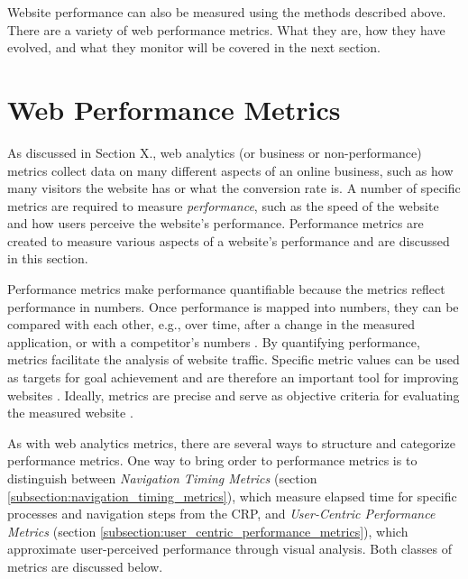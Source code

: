 Website performance can also be measured using the methods described above.
There are a variety of web performance metrics.
What they are, how they have evolved, and what they monitor will be covered in the next section.



\section{Web Performance Metrics} %
\label{section:web_performance_metrics}



As discussed in Section X., web analytics (or business or non-performance) metrics collect data on many different aspects of an online business, such as how many visitors the website has or what the conversion rate is.
A number of specific metrics are required to measure \textit{performance}, such as the speed of the website and how users perceive the website's performance.
Performance metrics are created to measure various aspects of a website's performance and are discussed in this section.



Performance metrics make performance quantifiable because the metrics reflect performance in numbers.
Once performance is mapped into numbers, they can be compared with each other, e.g., over time, after a change in the measured application, or with a competitor's numbers \cite{2021MDNMeasuringPerformance}.
By quantifying performance, metrics facilitate the analysis of website traffic.
Specific metric values can be used as targets for goal achievement and are therefore an important tool for improving websites \cite{2009Jansen}.
Ideally, metrics are precise and serve as objective criteria for evaluating the measured website \cite{2019Walton}.



As with web analytics metrics, there are several ways to structure and categorize performance metrics.
One way to bring order to performance metrics is to distinguish between \textit{Navigation Timing Metrics} (section \ref{subsection:navigation_timing_metrics}), which measure elapsed time for specific processes and navigation steps from the CRP, and \textit{User-Centric Performance Metrics} (section \ref{subsection:user_centric_performance_metrics}), which approximate user-perceived performance through visual analysis.
Both classes of metrics are discussed below.

